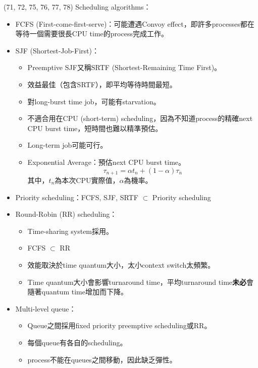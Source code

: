 \begin{theorem}{(71, 72, 75, 76, 77, 78)} Scheduling algorithms： \begin{itemize}
        \item FCFS (First-come-first-serve)：可能遭遇Convoy effect，即許多processes都在等待一個需要很長CPU time的process完成工作。
        \item SJF (Shortest-Job-First)：\begin{itemize}
            \item Preemptive SJF又稱SRTF (Shortest-Remaining Time First)。
            \item 效益最佳（包含SRTF），即平均等待時間最短。
            \item 對long-burst time job，可能有starvation。
            \item 不適合用在CPU (short-term) scheduling，因為不知道process的精確next CPU burst time，短時間也難以精準預估。
            \item Long-term job可能可行。
            \item Exponential Average：預估next CPU burst time。\begin{equation}
                \tau_{n + 1} = \alpha t_n + (1 - \alpha)\tau_n
            \end{equation} 其中，$t_n$為本次CPU實際值，$\alpha$為機率。
        \end{itemize}
        \item Priority scheduling：FCFS, SJF, SRTF $\subset$ Priority scheduling
        \item Round-Robin (RR) scheduling：\begin{itemize}
            \item Time-sharing system採用。
            \item FCFS $\subset$ RR
            \item 效能取決於time quantum大小，太小context switch太頻繁。
            \item Time quantum大小會影響turnaround time，平均turnaround time\textbf{未必}會隨著quantum time增加而下降。
        \end{itemize}
        \item Multi-level queue：\begin{itemize}
            \item Queue之間採用fixed priority preemptive scheduling或RR。
            \item 每個queue有各自的scheduling。
            \item process不能在queues之間移動，因此缺乏彈性。

\end{itemize}
\end{itemize}
\end{theorem}
